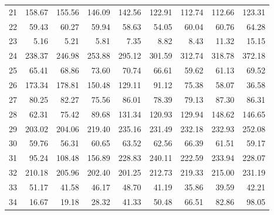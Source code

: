 \begin{table}[]
\begin{tabular}{l|rrrrrrrr}
		21 & 158.67 & 155.56 & 146.09 & 142.56 & 122.91 & 112.74 & 112.66 & 123.31 \\
		22 & 59.43 & 60.27 & 59.94 & 58.63 & 54.05 & 60.04 & 60.76 & 64.28 \\
		23 & 5.16 & 5.21 & 5.81 & 7.35 & 8.82 & 8.43 & 11.32 & 15.15 \\
		24 & 238.37 & 246.98 & 253.88 & 295.12 & 301.59 & 312.74 & 318.78 & 372.18 \\
		25 & 65.41 & 68.86 & 73.60 & 70.74 & 66.61 & 59.62 & 61.13 & 69.52 \\
		26 & 173.34 & 178.81 & 150.48 & 129.11 & 91.12 & 75.38 & 58.07 & 36.58 \\
		27 & 80.25 & 82.27 & 75.56 & 86.01 & 78.39 & 79.13 & 87.30 & 86.31 \\
		28 & 62.31 & 75.42 & 89.68 & 131.34 & 120.93 & 129.94 & 148.62 & 146.65 \\
		29 & 203.02 & 204.06 & 219.40 & 235.16 & 231.49 & 232.18 & 232.93 & 252.08 \\
		30 & 59.76 & 56.31 & 60.65 & 63.52 & 62.56 & 66.39 & 61.51 & 59.17 \\
		31 & 95.24 & 108.48 & 156.89 & 228.83 & 240.11 & 222.59 & 233.94 & 228.07 \\
		32 & 210.18 & 205.96 & 202.40 & 201.25 & 212.73 & 219.33 & 215.00 & 231.19 \\
		33 & 51.17 & 41.58 & 46.17 & 48.70 & 41.19 & 35.86 & 39.59 & 42.21 \\
		34 & 16.67 & 19.18 & 28.32 & 41.33 & 50.48 & 66.51 & 82.86 & 98.05
	\end{tabular}

\label{tab:Topics_investors_2015-2016}
\end{table}

